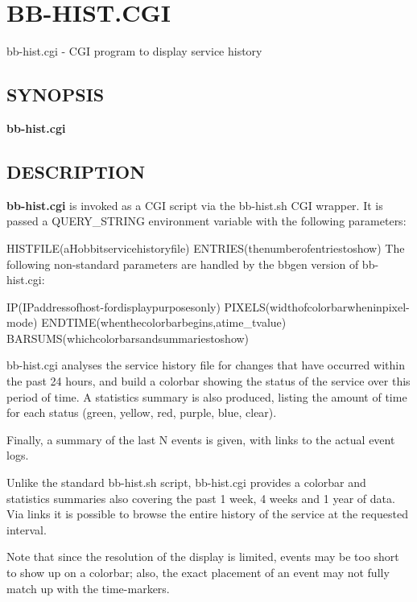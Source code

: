 %
\newpage
\section{BB-HIST.CGI}

 bb-hist.cgi - CGI program to display service history \subsection{SYNOPSIS}
\textbf{bb-hist.cgi}


 
\subsection{DESCRIPTION}
\textbf{bb-hist.cgi}
 is invoked as a CGI script via the bb-hist.sh CGI wrapper. It is
 passed a QUERY\_STRING environment variable with the following
 parameters: 


  
HISTFILE(aHobbitservicehistoryfile)  
ENTRIES(thenumberofentriestoshow)  
 The following non-standard parameters are handled by the bbgen version of bb-hist.cgi: 


  
IP(IPaddressofhost-fordisplaypurposesonly)  
PIXELS(widthofcolorbarwheninpixel-mode)  
ENDTIME(whenthecolorbarbegins,atime\_tvalue)  
BARSUMS(whichcolorbarsandsummariestoshow) 


  bb-hist.cgi analyses the service history file for changes that have
  occurred within the past 24 hours, and build a colorbar showing the
  status of the service over this period of time. A statistics summary
  is also produced, listing the amount of time for each status (green,
  yellow, red, purple, blue, clear). 



  Finally, a summary of the last N events is given, with links to the actual event logs. 


  Unlike the standard bb-hist.sh script, bb-hist.cgi provides a
  colorbar and statistics summaries also covering the past 1 week, 4
  weeks and 1 year of data. Via links it is possible to browse the
  entire history of the service at the requested interval. 



  Note that since the resolution of the display is limited, events may
  be too short to show up on a colorbar; also, the exact placement of
  an event may not fully match up with the time-markers. 



